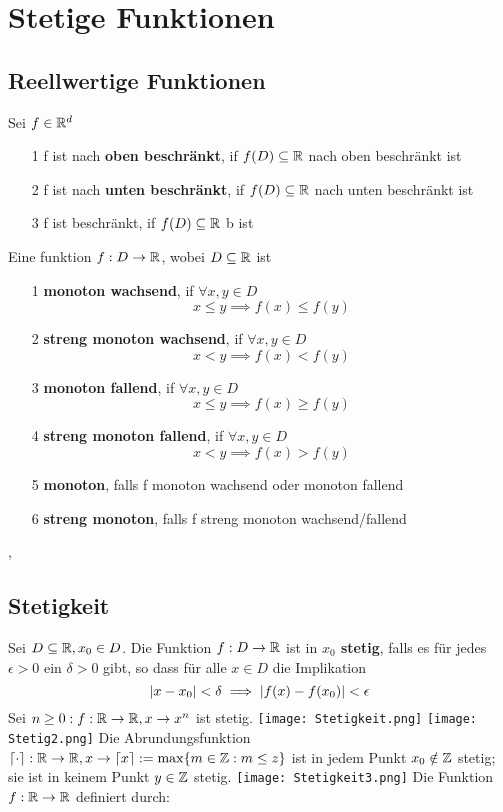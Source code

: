 \section{Stetige Funktionen}
\subsection{Reellwertige Funktionen}
\Def[3.1] Sei \( f \in \mathbb{R}^d\)
\begin{enumerate}
    \item [1] f ist nach \textbf{oben beschränkt}, if \(f(D) \subseteq \mathbb{R} \) nach oben beschränkt ist
    \item [2] f ist nach \textbf{unten beschränkt}, if \(f(D) \subseteq \mathbb{R} \) nach unten beschränkt ist
    \item [3] f ist beschränkt, if \(f(D) \subseteq \mathbb{R} \) b ist
\end{enumerate}
\Def[3.2] Eine funktion \(f: D \rightarrow \mathbb{R}\), wobei \(D \subseteq \mathbb{R}\) ist
\begin{enumerate}
    \item [1] \textbf{monoton wachsend}, if \(\forall x,y \in D\)
    \[x \leq y \implies f(x) \leq f(y) \]
    \item [2] \textbf{streng monoton wachsend}, if \(\forall x,y \in D\)
    \[x < y \implies f(x) < f(y)\]
    \item [3] \textbf{monoton fallend}, if \(\forall x,y \in D\)
    \[x \leq y \implies f(x) \geq f(y)\]
    \item [4] \textbf{streng monoton fallend}, if \(\forall x,y \in D\)
    \[x < y \implies f(x) > f(y)\]
    \item [5] \textbf{monoton}, falls f monoton wachsend oder monoton fallend
    \item [6] \textbf{streng monoton}, falls f streng monoton wachsend/fallend
\end{enumerate}
\sep
\subsection{Stetigkeit}
\Def[3.4] Sei \(D \subseteq \mathbb{R}, x_0 \in D\). Die Funktion \(f: D \rightarrow \mathbb{R} \) ist in \textbf{\(x_0\) stetig}, falls es für jedes \(\epsilon > 0 \) ein \(\delta > 0\) gibt, so dass für alle \(x \in D \) die Implikation
\[ \left\lvert x - x_0 \right\rvert < \delta \implies \left\lvert f(x) - f(x_0) \right\rvert < \epsilon\] \newline
\Bsp[3.6] Sei \( n \geq 0: f: \mathbb{R} \rightarrow \mathbb{R}, x \rightarrow x^n\) ist stetig.
\hspace*{-5mm}\texttt{[image: Stetigkeit.png]}
\texttt{[image: Stetig2.png]}
Die Abrundungsfunktion \( \lceil \cdot \rceil : \mathbb{R} \rightarrow \mathbb{R}, x \rightarrow \lceil x \rceil := \max \{ m \in \mathbb{Z}: m \leq z\}\)
ist in jedem Punkt \( x_0 \notin \mathbb{Z} \) stetig; sie ist in keinem Punkt \(y \in \mathbb{Z} \) stetig.
\texttt{[image: Stetigkeit3.png]}
Die Funktion \(f : \mathbb{R} \rightarrow \mathbb{R} \) definiert durch:

